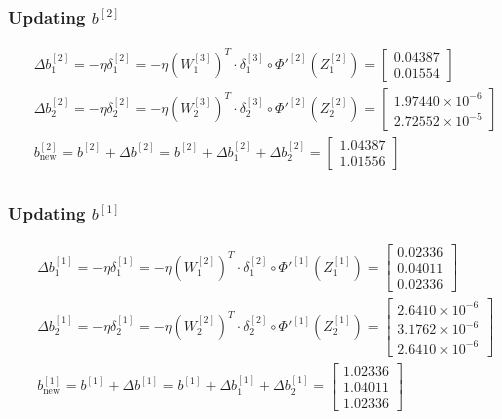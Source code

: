 \documentclass{article}
\begin{document}
\subsubsection*{Updating $b^{[2]}$}

\begin{align*}
    &\Delta b^{[2]}_1 = - \eta \delta^{[2]}_1 = - \eta (W^{[3]}_1)^T \cdot \delta^{[3]}_1 \circ \Phi'^{[2]}(Z^{[2]}_1) = \begin{bmatrix} 0.04387 \\  0.01554\end{bmatrix} \\
    &\Delta b^{[2]}_2 = - \eta \delta^{[2]}_2 = - \eta (W^{[3]}_2)^T \cdot \delta^{[3]}_2 \circ \Phi'^{[2]}(Z^{[2]}_2) = \begin{bmatrix} 1.97440\times 10^{-6} \\  2.72552\times 10^{-5}\end{bmatrix} \\
    &b^{[2]}_{\text{new}} = b^{[2]} + \Delta b^{[2]} = b^{[2]} + \Delta b^{[2]}_1 + \Delta b^{[2]}_2 = \begin{bmatrix} 1.04387 \\  1.01556\end{bmatrix} \\
\end{align*}

\subsubsection*{Updating $b^{[1]}$}

\begin{align*}
    &\Delta b^{[1]}_1 = - \eta \delta^{[1]}_1 = - \eta (W^{[2]}_1)^T \cdot \delta^{[2]}_1 \circ \Phi'^{[1]}(Z^{[1]}_1) = \begin{bmatrix} 0.02336 \\  0.04011 \\  0.02336\end{bmatrix} \\
    &\Delta b^{[1]}_2 = - \eta \delta^{[1]}_2 = - \eta (W^{[2]}_2)^T \cdot \delta^{[2]}_2 \circ \Phi'^{[1]}(Z^{[1]}_2) = \begin{bmatrix} 2.6410\times 10^{-6} \\  3.1762\times 10^{-6} \\  2.6410\times 10^{-6}\end{bmatrix} \\
    &b^{[1]}_{\text{new}} = b^{[1]} + \Delta b^{[1]} = b^{[1]} + \Delta b^{[1]}_1 + \Delta b^{[1]}_2 = \begin{bmatrix} 1.02336 \\  1.04011 \\  1.02336\end{bmatrix} \\
\end{align*}
\end{document}
